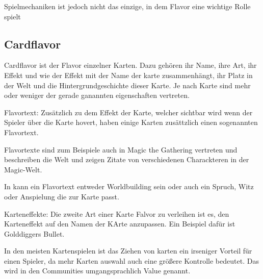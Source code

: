 Spielmechaniken ist jedoch nicht das einzige, in dem Flavor eine wichtige Rolle spielt

%
%

\subsection{Cardflavor}\label{subsec:flavour-durch-mechaniken}

Cardflavor ist der Flavor einzelner Karten.
Dazu gehören ihr Name, ihre Art, ihr Effekt und wie der Effekt mit der Name der karte zusammenhängt,
ihr Platz in der Welt und die Hintergrundgeschichte dieser Karte. Je nach Karte sind mehr oder weniger der gerade ganannten
eigenschaften vertreten.


Flavortext:
Zusätzlich zu dem Effekt der Karte, welcher sichtbar wird wenn der Spieler über die Karte hovert, haben einige Karten zusättzlich einen sogenannten Flavortext.


Flavortexte sind zum Beispiele auch in Magic the Gathering vertreten und beschreiben die Welt und zeigen Zitate von verschiedenen Charackteren in der Magic-Welt.\cite{magicarena,soulOfTheGame}%


In \FF kann ein Flavortext entweder Worldbuilding sein oder auch ein Spruch, Witz oder Anspielung die zur Karte passt.


Karteneffekte:
Die zweite Art einer Karte Falvor zu verleihen ist es, den Karteneffekt auf den Namen der KArte anzupassen.
Ein Beispiel dafür ist Golddiggers Bullet.


In den meisten Kartenspielen ist das Ziehen von karten ein irseniger Vorteil
für einen Spieler, da mehr Karten auswahl auch eine größere Kontrolle bedeutet.
Das wird in den Communities umgangsprachlich Value genannt. \cite{whatsvalue}


